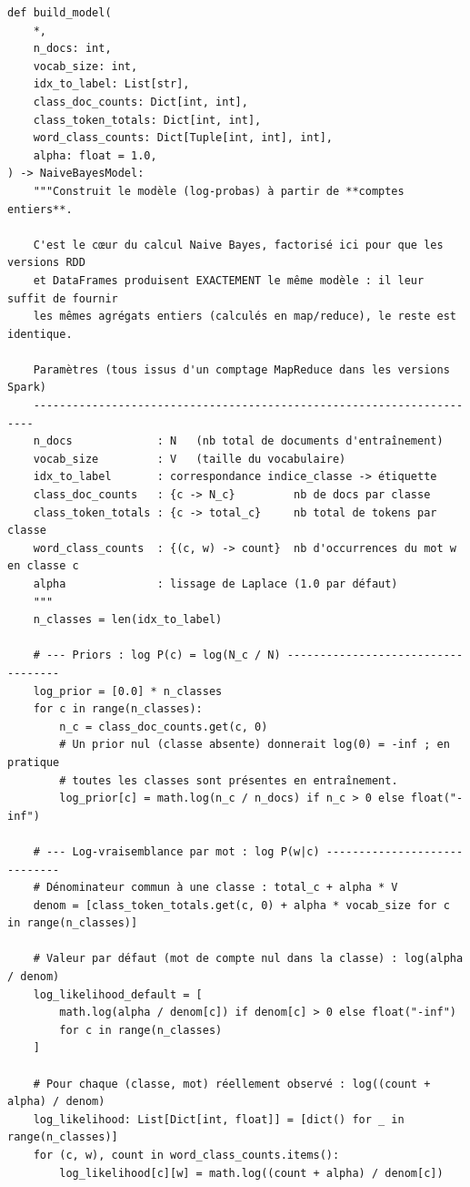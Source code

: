 \begin{lstlisting}[style=py]
def build_model(
    *,
    n_docs: int,
    vocab_size: int,
    idx_to_label: List[str],
    class_doc_counts: Dict[int, int],
    class_token_totals: Dict[int, int],
    word_class_counts: Dict[Tuple[int, int], int],
    alpha: float = 1.0,
) -> NaiveBayesModel:
    """Construit le modèle (log-probas) à partir de **comptes entiers**.

    C'est le cœur du calcul Naive Bayes, factorisé ici pour que les versions RDD
    et DataFrames produisent EXACTEMENT le même modèle : il leur suffit de fournir
    les mêmes agrégats entiers (calculés en map/reduce), le reste est identique.

    Paramètres (tous issus d'un comptage MapReduce dans les versions Spark)
    ----------------------------------------------------------------------
    n_docs             : N   (nb total de documents d'entraînement)
    vocab_size         : V   (taille du vocabulaire)
    idx_to_label       : correspondance indice_classe -> étiquette
    class_doc_counts   : {c -> N_c}         nb de docs par classe
    class_token_totals : {c -> total_c}     nb total de tokens par classe
    word_class_counts  : {(c, w) -> count}  nb d'occurrences du mot w en classe c
    alpha              : lissage de Laplace (1.0 par défaut)
    """
    n_classes = len(idx_to_label)

    # --- Priors : log P(c) = log(N_c / N) -----------------------------------
    log_prior = [0.0] * n_classes
    for c in range(n_classes):
        n_c = class_doc_counts.get(c, 0)
        # Un prior nul (classe absente) donnerait log(0) = -inf ; en pratique
        # toutes les classes sont présentes en entraînement.
        log_prior[c] = math.log(n_c / n_docs) if n_c > 0 else float("-inf")

    # --- Log-vraisemblance par mot : log P(w|c) -----------------------------
    # Dénominateur commun à une classe : total_c + alpha * V
    denom = [class_token_totals.get(c, 0) + alpha * vocab_size for c in range(n_classes)]

    # Valeur par défaut (mot de compte nul dans la classe) : log(alpha / denom)
    log_likelihood_default = [
        math.log(alpha / denom[c]) if denom[c] > 0 else float("-inf")
        for c in range(n_classes)
    ]

    # Pour chaque (classe, mot) réellement observé : log((count + alpha) / denom)
    log_likelihood: List[Dict[int, float]] = [dict() for _ in range(n_classes)]
    for (c, w), count in word_class_counts.items():
        log_likelihood[c][w] = math.log((count + alpha) / denom[c])


\end{lstlisting}
